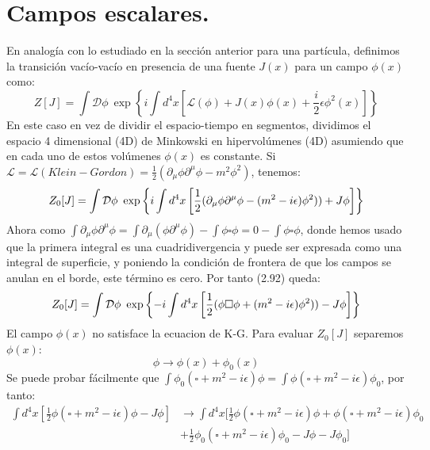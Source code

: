 \section{Campos escalares.}
En analogía con lo estudiado en la sección anterior para una partícula, definimos la transición vacío-vacío en presencia de una fuente $J(x)$ para un campo $\phi(x)$ como:
\begin{equation}
Z[J]=\int\mathcal{D}\phi\ \exp\left\{ i\int d^{4}x\left[\mathcal{L}(\phi)+J(x)\phi(x)+\frac{i}{2}\epsilon\phi^{2}(x)\right]\right\}
\end{equation}
En este caso en vez de dividir el espacio-tiempo en segmentos, dividimos el espacio 4 dimensional (4D) de Minkowski en hipervolúmenes (4D) asumiendo que en cada uno de estos volúmenes $\phi(x)$ es constante. Si $\mathcal{L}=\mathcal{L}(Klein-Gordon)=\frac{1}{2}(\partial_\mu\phi\partial^\mu\phi-m^2 \phi^2)$, tenemos:
\begin{equation}
Z_{0}[J]=\text{\ensuremath{\int\mathcal{D}}}\phi\ \exp\left\{ i\int d^{4}x\left[\frac{1}{2}(\partial_{\mu}\phi\partial^{\mu}\phi-(m^{2}-i\epsilon)\phi^{2}))+J\phi\right]\right\} 
\end{equation} 	
Ahora como $\int\partial_{\mu}\phi\partial^{\mu}\phi=\int\partial_{\mu}(\phi\partial^{\mu}\phi)-\int\phi\square\phi=0-\int\phi\square\phi$, donde hemos usado que la primera integral es una cuadridivergencia y puede ser expresada como una integral de superficie, y poniendo la condición de frontera de que los campos se anulan en el borde, este término es cero. Por tanto (2.92) queda:
\begin{equation}
Z_{0}[J]=\text{\ensuremath{\int\mathcal{D}}}\phi\ \exp\left\{ -i\int d^{4}x\left[\frac{1}{2}(\phi\square\phi+(m^{2}-i\epsilon)\phi^{2}))-J\phi\right]\right\} 
\end{equation}
El campo $\phi(x)$ no satisface la ecuacion de K-G. Para evaluar $Z_0[J]$ separemos $\phi(x)$:
\begin{equation}
\phi \rightarrow \phi(x)+\phi_0(x)
\end{equation}
Se puede probar fácilmente que $\int\phi_{0}(\square+m^{2}-i\epsilon)\phi=\int\phi(\square+m^{2}-i\epsilon)\phi_{0}$, por tanto:
\begin{eqnarray}
\nonumber \int d^{4}x\left[\frac{1}{2}\phi(\square+m^{2}-i\epsilon)\phi-J\phi\right]&\rightarrow\int d^{4}x[\frac{1}{2}\phi(\square+m^{2}-i\epsilon)\phi+\phi(\square+m^{2}-i\epsilon)\phi_{0}\\
&+\frac{1}{2}\phi_{0}(\square+m^{2}-i\epsilon)\phi_{0}-J\phi-J\phi_{0}]
\end{eqnarray}
